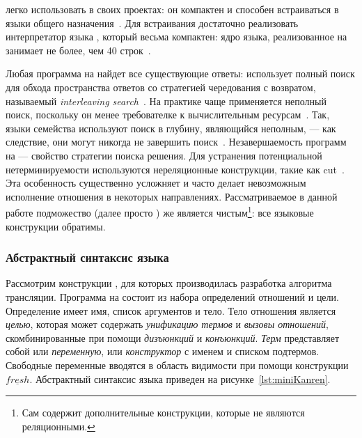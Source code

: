 \miniKanren{} легко использовать в своих проектах: он компактен и способен встраиваться в языки общего назначения~\cite{hemann2013ukanren, Kosarev2018TER}.
Для встраивания достаточно реализовать интерпретатор языка \miniKanren{}, который весьма компактен: ядро языка, реализованное на \scheme{} занимает не более, чем 40 строк~\cite{Friedman2005TRS, hemann2013ukanren}.

Любая программа на \miniKanren{} найдет все существующие ответы: \miniKanren{} использует полный поиск для обхода пространства ответов со стратегией чередования с возвратом, называемый \emph{interleaving search}~\cite{kiselyov2005bit}.
На практике чаще применяется неполный поиск, поскольку он менее требователке к вычислительным ресурсам~\cite{Hanus2012SSF}.
Так, языки семейства \prolog{} используют поиск в глубину, являющийся неполным, --- как следствие, они могут никогда не завершить поиск~\cite{Schreye1994TLP, Nerode1998LFA}.
Незавершаемость программ на \prolog{} --- свойство стратегии поиска решения.
Для устранения потенциальной нетерминируемости используются нереляционные конструкции, такие как cut~\cite{Lin1997ASC}.
Эта особенность существенно усложняет и часто делает невозможным исполнение отношения в некоторых направлениях.
Рассматриваемое в данной работе подможество \miniKanren{} (далее просто \miniKanren{}) же является чистым\footnote{Сам \miniKanren{} содержит дополнительные конструкции, которые не являются реляционными.}: все языковые конструкции обратимы.


\subsubsection{Абстрактный синтаксис языка \miniKanren{}}

Рассмотрим конструкции \miniKanren{}, для которых производилась разработка алгоритма трансляции.
Программа на \miniKanren{} состоит из набора определений отношений и цели. 
Определение имеет имя, список аргументов и тело.
Тело отношения является \textit{целью}, которая может содержать \textit{унификацию термов} и \textit{вызовы отношений}, скомбинированные при помощи \textit{дизъюнкций} и \textit{конъюнкций}. 
\textit{Терм} представляет собой или \textit{переменную}, или \textit{конструктор} с именем и списком подтермов. 
Свободные переменные вводятся в область видимости при помощи конструкции $\underline{fresh}$. 
Абстрактный синтаксис языка \miniKanren{} приведен на рисунке~\ref{lst:miniKanren}.

